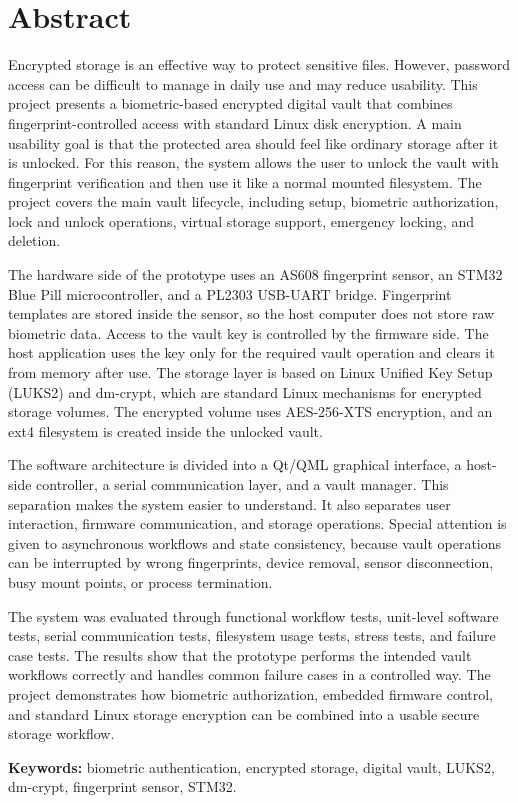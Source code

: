 \chapter*{Abstract}

Encrypted storage is an effective way to protect sensitive files. However, password access can be difficult to manage in daily use and may reduce usability. This project presents a biometric-based encrypted digital vault that combines fingerprint-controlled access with standard Linux disk encryption. A main usability goal is that the protected area should feel like ordinary storage after it is unlocked. For this reason, the system allows the user to unlock the vault with fingerprint verification and then use it like a normal mounted filesystem. The project covers the main vault lifecycle, including setup, biometric authorization, lock and unlock operations, virtual storage support, emergency locking, and deletion.

The hardware side of the prototype uses an AS608 fingerprint sensor, an STM32 Blue Pill microcontroller, and a PL2303 USB-UART bridge. Fingerprint templates are stored inside the sensor, so the host computer does not store raw biometric data. Access to the vault key is controlled by the firmware side. The host application uses the key only for the required vault operation and clears it from memory after use. The storage layer is based on Linux Unified Key Setup (LUKS2) and dm-crypt, which are standard Linux mechanisms for encrypted storage volumes. The encrypted volume uses AES-256-XTS encryption, and an ext4 filesystem is created inside the unlocked vault.

The software architecture is divided into a Qt/QML graphical interface, a host-side controller, a serial communication layer, and a vault manager. This separation makes the system easier to understand. It also separates user interaction, firmware communication, and storage operations. Special attention is given to asynchronous workflows and state consistency, because vault operations can be interrupted by wrong fingerprints, device removal, sensor disconnection, busy mount points, or process termination.

The system was evaluated through functional workflow tests, unit-level software tests, serial communication tests, filesystem usage tests, stress tests, and failure case tests. The results show that the prototype performs the intended vault workflows correctly and handles common failure cases in a controlled way. The project demonstrates how biometric authorization, embedded firmware control, and standard Linux storage encryption can be combined into a usable secure storage workflow.

\vfill
\textbf{Keywords:} biometric authentication, encrypted storage, digital vault, LUKS2, dm-crypt, fingerprint sensor, STM32.
\clearpage
